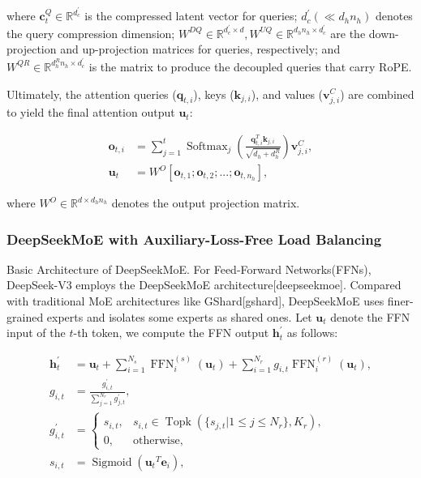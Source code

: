 \documentclass[11pt,a4paper]{article}
\begin{document}
where $\mathbf{c}_{t}^{Q} \in \mathbb{R}^{d_c^{\prime}}$ is the compressed latent vector for queries; $d_c^{\prime} (\ll d_h n_h)$ denotes the query compression dimension; $W^{DQ} \in \mathbb{R}^{d_c^{\prime} \times d}, W^{UQ} \in \mathbb{R}^{d_h n_h \times d_c^{\prime}}$ are the down-projection and up-projection matrices for queries, respectively; and $W^{QR} \in \mathbb{R}^{d_h^R n_h \times d_c^{\prime}}$ is the matrix to produce the decoupled queries that carry RoPE.

Ultimately, the attention queries ($\mathbf{q}_{t, i}$), keys ($\mathbf{k}_{j, i}$), and values ($\mathbf{v}_{j, i}^{C}$) are combined to yield the final attention output $\mathbf{u}_{t}$:

$$\begin{align}
    \mathbf{o}_{t, i} &= \sum_{j=1}^{t} \operatorname{Softmax}_j(\frac{\mathbf{q}_{t, i}^T \mathbf{k}_{j, i}}{\sqrt{d_{h} + d_{h}^{R}}}) \mathbf{v}_{j, i}^{C}, \\
    \mathbf{u}_{t} &= W^{O} [\mathbf{o}_{t, 1};\mathbf{o}_{t, 2};...;\mathbf{o}_{t, n_{h}}],
\end{align}$$

where $W^{O} \in \mathbb{R}^{d \times d_h n_h}$ denotes the output projection matrix.

\subsubsection{DeepSeekMoE with Auxiliary-Loss-Free Load Balancing}

Basic Architecture of DeepSeekMoE. For Feed-Forward Networks(FFNs), DeepSeek-V3 employs the DeepSeekMoE architecture[deepseekmoe]. Compared with traditional MoE architectures like GShard[gshard], DeepSeekMoE uses finer-grained experts and isolates some experts as shared ones. Let $\mathbf{u}_{t}$ denote the FFN input of the $t$-th token, we compute the FFN output $\mathbf{h}_{t}^{\prime}$ as follows:

$$\begin{align}
    \mathbf{h}_{t}^{\prime} & = \mathbf{u}_{t} + \sum_{i=1}^{N_{s}} {\operatorname{FFN}^{(s)}_{i}\left( \mathbf{u}_{t} \right)} + \sum_{i=1}^{N_r} {g_{i,t} \operatorname{FFN}^{(r)}_{i}\left( \mathbf{u}_{t} \right)}, \\
    g_{i,t} & = \frac{g^{\prime}_{i,t}}{\sum_{j=1}^{N_r} g^{\prime}_{j,t}}, \\
    g^{\prime}_{i,t} & = \begin{cases} 
    s_{i,t}, & s_{i,t} \in \operatorname{Topk} (\{ s_{j, t} | 1 \leq j \leq N_r \}, K_{r}), \\
    0, & \text{otherwise}, 
    \end{cases} \\
    s_{i,t} & = \operatorname{Sigmoid} \left( {\mathbf{u}_{t}}^{T} \mathbf{e}_{i} \right),
\end{align}$$
\end{document}
